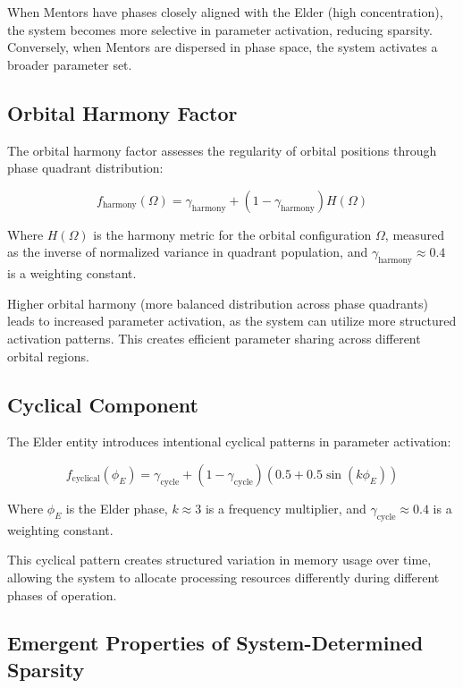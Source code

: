 When Mentors have phases closely aligned with the Elder (high concentration), the system becomes more selective in parameter activation, reducing sparsity. Conversely, when Mentors are dispersed in phase space, the system activates a broader parameter set.

\subsection{Orbital Harmony Factor}

The orbital harmony factor assesses the regularity of orbital positions through phase quadrant distribution:

\begin{equation}
f_{\text{harmony}}(\Omega) = \gamma_{\text{harmony}} + (1 - \gamma_{\text{harmony}})H(\Omega)
\end{equation}

Where $H(\Omega)$ is the harmony metric for the orbital configuration $\Omega$, measured as the inverse of normalized variance in quadrant population, and $\gamma_{\text{harmony}} \approx 0.4$ is a weighting constant.

Higher orbital harmony (more balanced distribution across phase quadrants) leads to increased parameter activation, as the system can utilize more structured activation patterns. This creates efficient parameter sharing across different orbital regions.

\subsection{Cyclical Component}

The Elder entity introduces intentional cyclical patterns in parameter activation:

\begin{equation}
f_{\text{cyclical}}(\phi_E) = \gamma_{\text{cycle}} + (1 - \gamma_{\text{cycle}})(0.5 + 0.5\sin(k\phi_E))
\end{equation}

Where $\phi_E$ is the Elder phase, $k \approx 3$ is a frequency multiplier, and $\gamma_{\text{cycle}} \approx 0.4$ is a weighting constant.

This cyclical pattern creates structured variation in memory usage over time, allowing the system to allocate processing resources differently during different phases of operation.

\subsection{Emergent Properties of System-Determined Sparsity}

